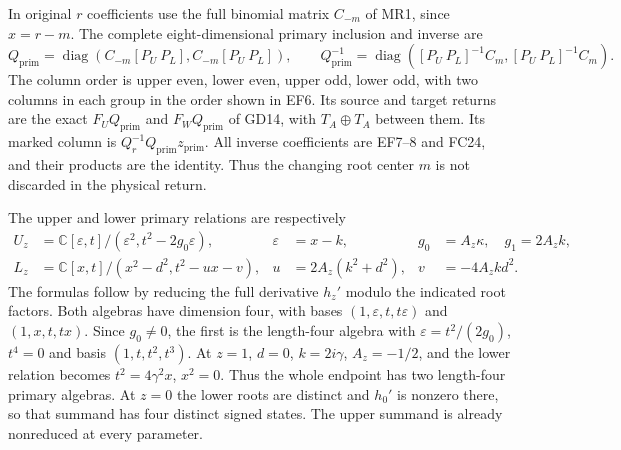 \documentclass[11pt]{article}
\begin{document}
In original $r$ coefficients use the full binomial
matrix $C_{-m}$ of MR1, since $x=r-m$. The complete
eight-dimensional primary inclusion and inverse are
\begin{equation}
Q_{\mathrm{prim}}=
 \operatorname{diag}(C_{-m}[P_U\ P_L],C_{-m}[P_U\ P_L]),\qquad
Q_{\mathrm{prim}}^{-1}=
 \operatorname{diag}([P_U\ P_L]^{-1}C_m,[P_U\ P_L]^{-1}C_m).
 \tag{EF8}
\end{equation}
The column order is upper even, lower even, upper odd,
lower odd, with two columns in each group in the order
shown in EF6. Its source and target returns are the exact
$F_UQ_{\mathrm{prim}}$ and $F_WQ_{\mathrm{prim}}$ of
GD14, with $T_A\oplus T_A$ between them. Its marked
column is $Q_r^{-1}Q_{\mathrm{prim}}z_{\mathrm{prim}}$.
All inverse coefficients are EF7--8 and FC24, and
their products are the identity. Thus the changing
root center $m$ is not discarded in the physical return.

The upper and lower primary relations are respectively
\begin{equation}
\begin{aligned}
 U_z&=\mathbb C[\varepsilon,t]/(\varepsilon^2,t^2-2g_0\varepsilon),
 &\varepsilon&=x-k,&g_0&=A_z\kappa,\quad g_1=2A_zk,\\
 L_z&=\mathbb C[x,t]/(x^2-d^2,t^2-u x-v),
 &u&=2A_z(k^2+d^2),&v&=-4A_zkd^2.
\end{aligned}\tag{EF9}
\end{equation}
The formulas follow by reducing the full derivative
$h_z'$ modulo the indicated root factors. Both algebras
have dimension four, with bases $(1,\varepsilon,t,t\varepsilon)$
and $(1,x,t,tx)$. Since $g_0\ne0$, the first is the
length-four algebra with $\varepsilon=t^2/(2g_0)$,
$t^4=0$ and basis $(1,t,t^2,t^3)$.
At $z=1$, $d=0$, $k=2i\gamma$, $A_z=-1/2$,
and the lower relation becomes $t^2=4\gamma^2x$,
$x^2=0$. Thus the whole endpoint has two length-four
primary algebras. At $z=0$ the lower roots are
distinct and $h_0'$ is nonzero there, so that summand
has four distinct signed states. The upper summand is
already nonreduced at every parameter.
\end{document}
